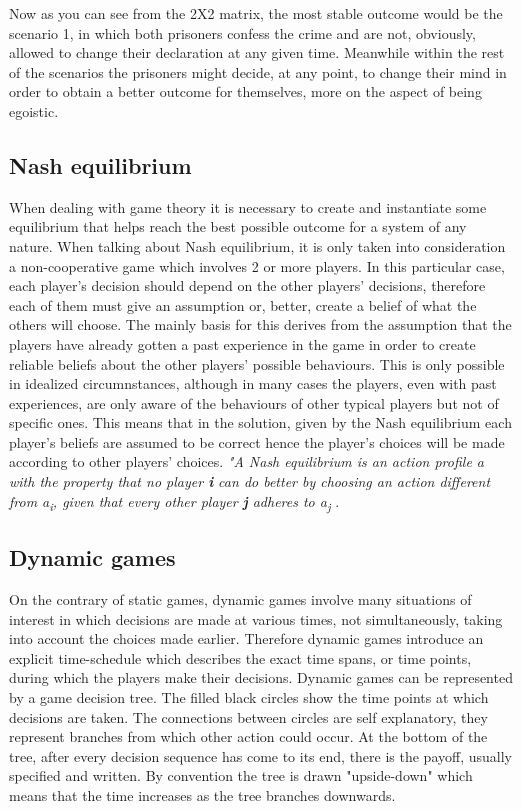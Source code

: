 \documentclass[conference]{IEEEtran}
\begin{document}
Now as you can see from the 2X2 matrix, the most stable outcome would be the scenario 1, in which both prisoners confess the crime and are not, obviously, allowed to change their declaration at any given time. Meanwhile within the rest of the scenarios the prisoners might decide, at any point, to change their mind in order to obtain a better outcome for themselves, more on the aspect of being egoistic\cite{b5}.


\subsection{Nash equilibrium}
When dealing with game theory it is necessary to create and instantiate some equilibrium that helps reach the best possible outcome for a system of any nature. When talking about Nash equilibrium, it is only taken into consideration a non-cooperative game which involves 2 or more players. In this particular case, each player's decision should depend on the other players' decisions, therefore each of them must give an assumption or, better, create a belief of what the others will choose. The mainly basis for this derives from the assumption that the players have already gotten a past experience in the game in order to create reliable beliefs about the other players' possible behaviours.
This is only possible in idealized circumnstances, although in many cases the players, even with past experiences, are only aware of the behaviours of other typical players but not of specific ones. This means that in the solution, given by the Nash equilibrium each player's beliefs are assumed to be correct hence the player's choices will be made according to other players' choices. 
\textit{"A Nash equilibrium is an action profile a\textsuperscript{\text{*}} with the property that no player \textbf{i} can do better by choosing an action different from a\textsuperscript{\text{*}}\textsubscript{i}, given that every other player \textbf{j} adheres to a\textsuperscript{\text{*}}\textsubscript{j} }\cite{b6}.


\subsection{Dynamic games}
On the contrary of static games, dynamic games involve many situations of interest in which decisions are
made at various times, not simultaneously, taking into account the choices made earlier. Therefore dynamic games introduce an explicit time-schedule which describes the exact time spans, or time points, during which the players make their decisions.
Dynamic games can be represented by a game decision tree. The filled black circles show the time points at which decisions are taken. The connections between circles are self explanatory, they represent branches from which other action could occur. At the bottom of the tree, after every decision sequence has come to its end, there is the payoff, usually specified and written. By convention the tree is drawn "upside-down" which means that the time increases as the tree branches downwards.
\end{document}
